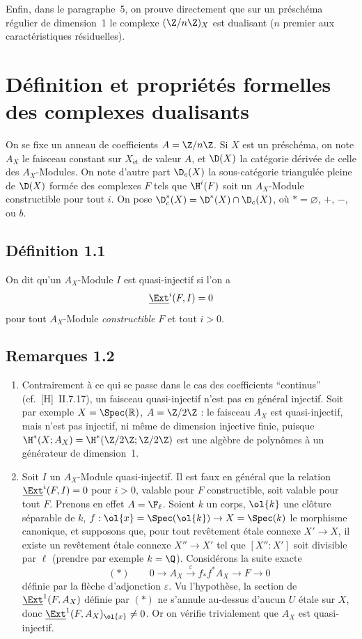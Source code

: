 Enfin, dans le paragraphe~5, on prouve directement que sur un préschéma régulier de dimension~1 le complexe $(\Z/n\Z)_X$ est dualisant ($n$ premier aux caractéristiques résiduelles).

\section*{Définition et propriétés formelles des complexes dualisants}

On se fixe un anneau de coefficients $A = \Z/n\Z$. Si $X$ est un préschéma, on note $A_X$ le faisceau constant sur $X_{\mathrm{\acute{e}t}}$ de valeur $A$, et $\D(X)$ la catégorie dérivée de celle des $A_X$-Modules. On note d'autre part $\D_c(X)$ la sous-catégorie triangulée pleine de $\D(X)$ formée des complexes $F$ tels que $\H^i(F)$ soit un $A_X$-Module constructible pour tout $i$. On pose $\D_c^{*}(X) = \D^{*}(X) \cap \D_c(X)$, où $* = \varnothing$, $+$, $-$, ou $b$.

\subsection*{Définition 1.1}
On dit qu'un $A_X$-Module $I$ est quasi-injectif si l'on a
\[
\underline{\Ext}^i(F,I) = 0
\]
pour tout $A_X$-Module \emph{constructible} $F$ et tout $i > 0$.

\subsection*{Remarques 1.2}
\begin{enumerate}[label=\alph*)]
\item Contrairement à ce qui se passe dans le cas des coefficients ``continus'' (cf.~[H]~II.7.17), un faisceau quasi-injectif n'est pas en général injectif. Soit par exemple $X = \Spec(\mathbb{R})$, $A = \Z/2\Z$ : le faisceau $A_X$ est quasi-injectif, mais n'est pas injectif, ni même de dimension injective finie, puisque $\H^{*}(X; A_X) = \H^{*}(\Z/2\Z; \Z/2\Z)$ est une algèbre de polynômes à un générateur de dimension~1.

\item Soit $I$ un $A_X$-Module quasi-injectif. Il est faux en général que la relation $\underline{\Ext}^i(F,I) = 0$ pour $i > 0$, valable pour $F$ constructible, soit valable pour tout $F$. Prenons en effet $A = \F_{\ell}$. Soient $k$ un corps, $\ol{k}$ une clôture séparable de $k$, $f : \ol{x} = \Spec(\ol{k}) \to X = \Spec(k)$ le morphisme canonique, et supposons que, pour tout revêtement étale connexe $X' \to X$, il existe un revêtement étale connexe $X'' \to X'$ tel que $[X'':X']$ soit divisible par $\ell$ (prendre par exemple $k = \Q$). Considérons la suite exacte
\[
(*) \qquad 0 \longrightarrow A_X \xrightarrow{\;\varepsilon\;} f_{*}f^{*}A_X \longrightarrow F \longrightarrow 0
\]
définie par la
flèche d'adjonction $\varepsilon$. Vu l'hypothèse, la section de $\underline{\Ext}^1(F,A_X)$ définie par $(*)$ ne s'annule au-dessus d'aucun $U$ étale sur $X$, donc $\underline{\Ext}^1(F,A_X)_{\ol{x}} \neq 0$. Or on vérifie trivialement que $A_X$ est quasi-injectif.
\end{enumerate}

